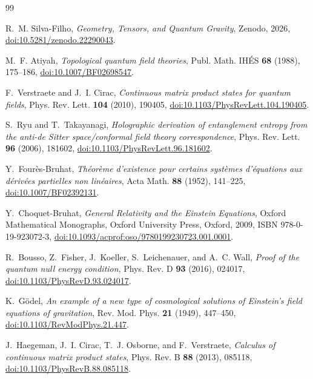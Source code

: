 \documentclass[11pt,a4paper,reqno]{amsart}
\theoremstyle{definition}
\numberwithin{equation}{section}
\begin{document}
\raggedright
\begin{thebibliography}{99}

R.~M. Silva-Filho,
\emph{Geometry, Tensors, and Quantum Gravity},
Zenodo, 2026, \href{https://doi.org/10.5281/zenodo.22290043}{doi:10.5281/zenodo.22290043}.

M.~F. Atiyah,
\emph{Topological quantum field theories},
Publ. Math. IH\'ES \textbf{68} (1988), 175--186,
\href{https://doi.org/10.1007/BF02698547}{doi:10.1007/BF02698547}.

F.~Verstraete and J.~I. Cirac,
\emph{Continuous matrix product states for quantum fields},
Phys. Rev. Lett. \textbf{104} (2010), 190405,
\href{https://doi.org/10.1103/PhysRevLett.104.190405}{doi:10.1103/PhysRevLett.104.190405}.

S.~Ryu and T.~Takayanagi,
\emph{Holographic derivation of entanglement entropy from the anti-de Sitter space/conformal field theory correspondence},
Phys. Rev. Lett. \textbf{96} (2006), 181602,
\href{https://doi.org/10.1103/PhysRevLett.96.181602}{doi:10.1103/PhysRevLett.96.181602}.

Y.~Four\`es-Bruhat,
\emph{Th\'eor\`eme d'existence pour certains syst\`emes d'\'equations aux d\'eriv\'ees partielles non lin\'eaires},
Acta Math. \textbf{88} (1952), 141--225,
\href{https://doi.org/10.1007/BF02392131}{doi:10.1007/BF02392131}.

Y.~Choquet-Bruhat,
\emph{General Relativity and the Einstein Equations},
Oxford Mathematical Monographs, Oxford University Press, Oxford, 2009, ISBN 978-0-19-923072-3,
\href{https://doi.org/10.1093/acprof:oso/9780199230723.001.0001}{doi:10.1093/acprof:oso/9780199230723.001.0001}.

R.~Bousso, Z.~Fisher, J.~Koeller, S.~Leichenauer, and A.~C. Wall,
\emph{Proof of the quantum null energy condition},
Phys. Rev. D \textbf{93} (2016), 024017,
\href{https://doi.org/10.1103/PhysRevD.93.024017}{doi:10.1103/PhysRevD.93.024017}.

K.~G\"odel,
\emph{An example of a new type of cosmological solutions of Einstein's field equations of gravitation},
Rev. Mod. Phys. \textbf{21} (1949), 447--450,
\href{https://doi.org/10.1103/RevModPhys.21.447}{doi:10.1103/RevModPhys.21.447}.

J.~Haegeman, J.~I. Cirac, T.~J. Osborne, and F.~Verstraete,
\emph{Calculus of continuous matrix product states},
Phys. Rev. B \textbf{88} (2013), 085118,
\href{https://doi.org/10.1103/PhysRevB.88.085118}{doi:10.1103/PhysRevB.88.085118}.


\end{thebibliography}
\end{document}
